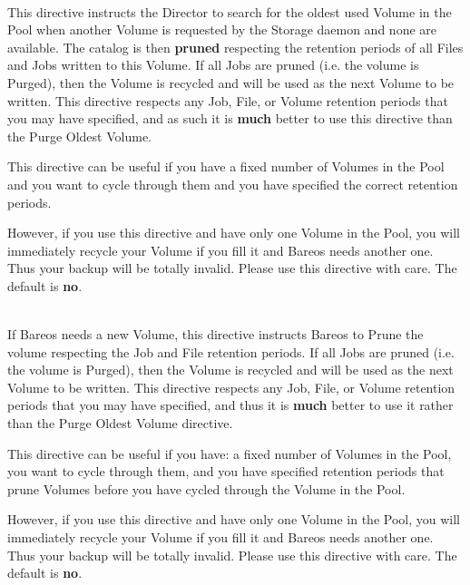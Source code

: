 \begin{description}
\label{RecycleOldest}
\item [Recycle Oldest Volume = {\textless}yes{\textbar}no{\textgreater}] \hfill \\
This directive instructs the Director to search for the oldest used
Volume in the Pool when another Volume is requested by the Storage
daemon and none are available.  The catalog is then {\bf pruned}
respecting the retention periods of all Files and Jobs written to this
Volume.  If all Jobs are pruned (i.e. the volume is Purged), then the
Volume is recycled and will be used as the next Volume to be written.
This directive respects any Job, File, or Volume retention periods that
you may have specified, and as such it is {\bf much} better to use this
directive than the Purge Oldest Volume.

This directive can be useful if you have a fixed number of Volumes in the
Pool and you want to cycle through them and you have specified the correct
retention periods.

However, if you use this directive and have only one
Volume in the Pool, you will immediately recycle your Volume if you fill
it and Bareos needs another one. Thus your backup will be totally invalid.
Please use this directive with care. The default is {\bf no}.

\label{RecycleCurrent}
\item [Recycle Current Volume = {\textless}yes{\textbar}no{\textgreater}] \hfill \\
If Bareos needs a new Volume, this directive instructs Bareos to Prune
the volume respecting the Job and File retention periods.  If all Jobs
are pruned (i.e.  the volume is Purged), then the Volume is recycled and
will be used as the next Volume to be written.  This directive respects
any Job, File, or Volume retention periods that you may have specified,
and thus it is {\bf much} better to use it rather than the Purge Oldest
Volume directive.

This directive can be useful if you have: a fixed number of Volumes in
the Pool, you want to cycle through them, and you have specified
retention periods that prune Volumes before you have cycled through the
Volume in the Pool.

However, if you use this directive and have only one Volume in the Pool,
you will immediately recycle your Volume if you fill it and Bareos needs
another one.  Thus your backup will be totally invalid.  Please use this
directive with care.  The default is {\bf no}.


\end{description}

